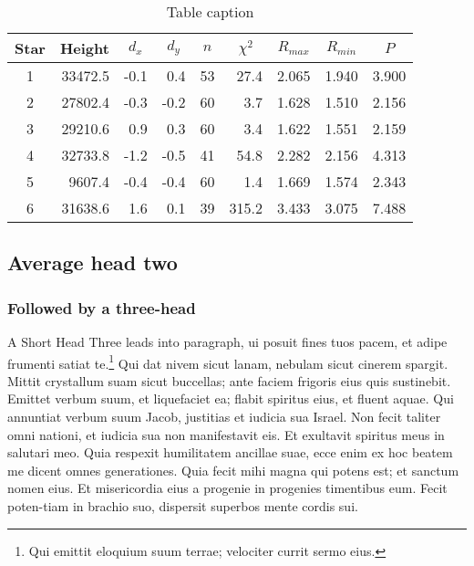 \documentclass[numbers,compress]{vmsta2}
\theoremstyle{definition}
\begin{document}
\begin{table}
\caption{Table caption}\label{tbl-2} %
\begin{tabular*}{\textwidth}{@{\extracolsep{\fill}}crrrrrrrr@{}}
\hline
Star & Height & \multicolumn{1}{c}{$d_{x}$} &
\multicolumn{1}{c}{$d_{y}$} &
\multicolumn{1}{c}{$n$} &
\multicolumn{1}{c}{$\chi^2$} &
\multicolumn{1}{c}{$R_{max}$} &
\multicolumn{1}{c}{$R_{min}$} &
\multicolumn{1}{c}{$P$}  \\
\hline
1 &33472.5 &-0.1 &0.4  &53 &27.4 &2.065  &1.940 &3.900\\
2 &27802.4 &-0.3 &-0.2 &60 &3.7  &1.628  &1.510 &2.156\\
3 &29210.6 &0.9  &0.3  &60 &3.4  &1.622  &1.551 &2.159\\
4 &32733.8 &-1.2 &-0.5 &41 &54.8 &2.282  &2.156 &4.313\\
5 & 9607.4 &-0.4 &-0.4 &60 &1.4  &1.669  &1.574 &2.343\\
6 &31638.6 &1.6  &0.1  &39 &315.2 & 3.433 &3.075 &7.488\\
\hline
\end{tabular*}
\end{table}


\subsection{Average head two}

\subsubsection{Followed by a three-head}

A Short Head Three leads into paragraph, ui posuit fines tuos pacem,
et adipe frumenti satiat te.\footnote{Qui emittit eloquium suum terrae;
velociter currit sermo eius.} Qui dat nivem sicut lanam, nebulam
sicut cinerem spargit. Mittit crystallum suam sicut buccellas; ante
faciem frigoris eius quis sustinebit. Emittet verbum suum, et
liquefaciet ea; flabit spiritus eius, et fluent aquae. Qui annuntiat
verbum suum Jacob, justitias et iudicia sua Israel. Non fecit taliter omni
nationi, et iudicia sua non manifestavit eis. Et exultavit spiritus meus
in salutari meo.  Quia respexit humilitatem ancillae suae, ecce enim ex
hoc beatem me dicent omnes generationes. Quia fecit mihi magna qui potens
est; et sanctum nomen eius. Et misericordia eius a progenie in progenies
timentibus eum. Fecit poten-tiam in brachio suo, dispersit superbos mente
cordis sui.
\end{document}
